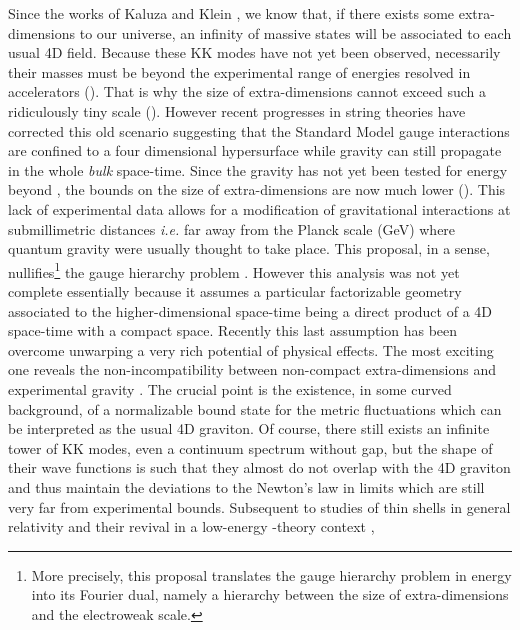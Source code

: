 \documentclass[a4paper,12pt]{article}
\begin{document}
Since the works of Kaluza and Klein \cite{KK}, we know that, if
there exists some extra-dimensions
to our universe,
an infinity of massive states will be associated to each usual
4D field. Because these KK modes have not yet been observed, necessarily
their masses must be beyond the experimental range of energies resolved in
accelerators (\coordHE{}). That is why the size of extra-dimensions cannot
exceed such a ridiculously tiny scale (\coordHE{}).
However recent progresses in string theories \cite{Strings} have corrected this old
scenario suggesting that the Standard Model gauge interactions are
confined to a four dimensional hypersurface while gravity can still propagate
in the whole {\it bulk} space-time. Since the gravity has not yet been tested
for energy beyond \coordHE{} \cite{Gravity Exp},
the bounds on the size of extra-dimensions
are now much lower (\coordHE{}). This lack of experimental
data allows for a modification of gravitational interactions at submillimetric
distances {\it i.e.} far away from the Planck scale (\coordHE{}GeV) where
quantum gravity were usually thought to take place. This proposal, in a sense,
nullifies\footnote{More precisely, this proposal translates the gauge hierarchy
problem in energy into its Fourier dual, namely a hierarchy between the size of
extra-dimensions and the electroweak scale.} the gauge hierarchy problem \cite{AADD}.
However this analysis was not yet complete essentially because it assumes
a particular factorizable geometry associated to the higher-dimensional space-time
being a direct product of a 4D space-time with a compact space.
Recently this last assumption has been overcome \cite{RS} unwarping
a very rich potential of physical effects. The most exciting one reveals
the non-incompatibility between non-compact extra-dimensions and experimental
gravity \cite{LR}. The crucial point is the existence, in some curved background,
of a normalizable bound state for the metric fluctuations which can be interpreted as the usual
4D graviton. Of course, there still exists an infinite tower of KK modes, even
a continuum spectrum without gap, but the shape of their wave functions
is such that they almost do not overlap with the 4D graviton and thus maintain
the deviations to the Newton's law in limits which are still very far from
experimental bounds. Subsequent to studies of thin shells in general relativity
\cite{Shell} and their revival in a low-energy \coordHE{}-theory context \cite{Mtheory},
\end{document}
